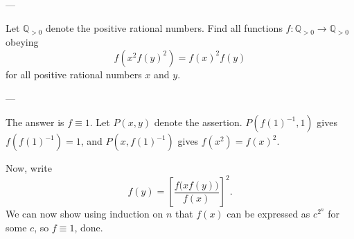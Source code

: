 
---

Let $\mathbb Q_{>0}$ denote the positive rational numbers. Find all functions $f:\mathbb Q_{>0}\to\mathbb Q_{>0}$ obeying \[f\left(x^2f(y)^2\right)=f(x)^2f(y)\]
for all positive rational numbers $x$ and $y$.

---

The answer is $\boxed{f\equiv 1}$. Let $P(x,y)$ denote the assertion. $P(f(1)^{-1},1)$ gives $f(f(1)^{-1})=1$, and $P(x,f(1)^{-1})$ gives $f(x^2)=f(x)^2$.

Now, write \[f(y)=\left[\frac{f\big(xf(y)\big)}{f(x)}\right]^2.\]
We can now show using induction on $n$ that $f(x)$ can be expressed as $c^{2^n}$ for some $c$, so $f\equiv 1$, done.
